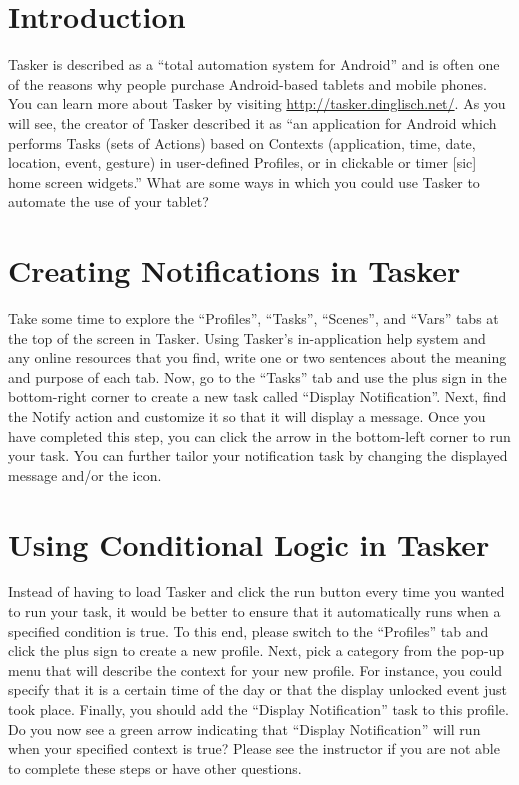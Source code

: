

\usepackage[compact]{titlesec}



\section*{Introduction}

Tasker is described as a ``total automation system for Android'' and is often one of the reasons why people purchase
Android-based tablets and mobile phones.  You can learn more about Tasker by visiting
\url{http://tasker.dinglisch.net/}. As you will see, the creator of Tasker described it as ``an application for Android
which performs Tasks (sets of Actions) based on Contexts (application, time, date, location, event, gesture) in
user-defined Profiles, or in clickable or timer [sic] home screen widgets.''  What are some ways in which you could use
Tasker to automate the use of your tablet?

\section*{Creating Notifications in Tasker}

Take some time to explore the ``Profiles'', ``Tasks'', ``Scenes'', and ``Vars'' tabs at the top of the screen in Tasker.
Using Tasker's in-application help system and any online resources that you find, write one or two sentences about the
meaning and purpose of each tab. Now, go to the ``Tasks'' tab and use the plus sign in the bottom-right corner to create
a new task called ``Display Notification''.  Next, find the Notify action and customize it so that it will display a
message.  Once you have completed this step, you can click the arrow in the bottom-left corner to run your task. You can
further tailor your notification task by changing the displayed message and/or the icon. 

\section*{Using Conditional Logic in Tasker}

Instead of having to load Tasker and click the run button every time you wanted to run your task, it would be better to
ensure that it automatically runs when a specified condition is true. To this end, please switch to the ``Profiles'' tab
and click the plus sign to create a new profile.  Next, pick a category from the pop-up menu that will describe the
context for your new profile.  For instance, you could specify that it is a certain time of the day or that the display
unlocked event just took place. Finally, you should add the ``Display Notification'' task to this profile.  Do you now
see a green arrow indicating that ``Display Notification'' will run when your specified context is true?  Please see the
instructor if you are not able to complete these steps or have other questions.

